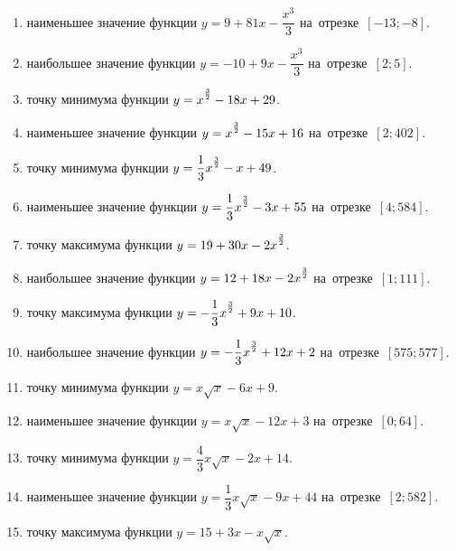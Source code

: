 \documentclass[a4paper,10pt]{article}
\begin{document}
\begin{enumerate}
\item {} наименьшее значение функции $y=9 +81x-\dfrac{x^3}{3}$ на~отрезке~$\left[-13;-8\right]$.

\item {} наибольшее значение функции $y=-10 +9x-\dfrac{x^3}{3}$ на~отрезке~$\left[2;5\right]$.

\item {} точку минимума функции $y=x\strut^{\frac{3}{2}} -18x+29$.

\item {} наименьшее значение функции $y=x\strut^{\frac{3}{2}} -15x+16$ на~отрезке~$\left[2;402\right]$.

\item {} точку минимума функции $y=\dfrac{1}{3}x\strut^{\frac{3}{2}} -x+49$.

\item {} наименьшее значение функции $y=\dfrac{1}{3}x\strut^{\frac{3}{2}} -3x+55$ на~отрезке~$\left[4;584\right]$.

\item {} точку максимума функции $y=19+30x-2x\strut^{\frac{3}{2}}$.

\item {} наибольшее значение функции $y=12+18x-2x\strut^{\frac{3}{2}}$ на~отрезке~$\left[1;111\right]$.

\item {} точку максимума функции $y=-\dfrac{1}{3}x\strut^{\frac{3}{2}} +9x+10$.

\item {} наибольшее значение функции $y=-\dfrac{1}{3}x\strut^{\frac{3}{2}} +12x+2$ на~отрезке~$\left[575;577\right]$.

\item {} точку минимума функции $y=x\sqrt{x} -6x+9$.

\item {} наименьшее значение функции $y=x\sqrt{x} -12x+3$ на~отрезке~$\left[0;64\right]$.

\item {} точку минимума функции $y=\dfrac{4}{3}x\sqrt{x} -2x+14$.

\item {} наименьшее значение функции $y=\dfrac{1}{3}x\sqrt{x} -9x+44$ на~отрезке~$\left[2;582\right]$.

\item {} точку максимума функции $y=15+3x -x\sqrt{x}$.


\end{enumerate}
\end{document}
